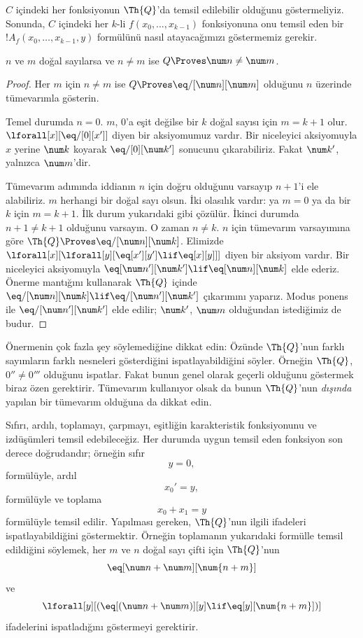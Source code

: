 \documentclass[../../../include/open-logic-section]{subfiles}
\begin{document}

$C$ içindeki her fonksiyonun $\Th{Q}$'da temsil edilebilir olduğunu
göstermeliyiz. Sonunda, $C$ içindeki her $k$-li
$f(x_0,\dots,x_{k-1})$ fonksiyonuna onu temsil eden bir
$!A_f(x_0,\dots,x_{k-1},y)$ formülünü nasıl atayacağımızı göstermemiz gerekir.

\begin{lem}
$n$ ve $m$ doğal sayılarsa ve $n \neq m$ ise
$Q \Proves \num n \neq \num m$.
\end{lem}

\begin{proof}
Her $m$ için $n \neq m$ ise $Q \Proves \eq/[\num n][\num m]$ olduğunu
$n$ üzerinde tümevarımla gösterin.

Temel durumda $n = 0$. $m$, $0$'a eşit değilse bir $k$ doğal sayısı için
$m = k + 1$ olur. $\lforall[x][\eq/[0][x']]$ diyen bir aksiyomumuz vardır.
Bir niceleyici aksiyomuyla $x$ yerine $\num k$ koyarak
$\eq/[0][\num k']$ sonucunu çıkarabiliriz. Fakat $\num k'$, yalnızca
$\num m$'dir.

Tümevarım adımında iddianın $n$ için doğru olduğunu varsayıp $n+1$'i ele
alabiliriz. $m$ herhangi bir doğal sayı olsun. İki olasılık vardır: ya $m=0$
ya da bir $k$ için $m=k+1$. İlk durum yukarıdaki gibi çözülür. İkinci durumda
$n+1 \neq k+1$ olduğunu varsayın. O zaman $n \neq k$. $n$ için tümevarım
varsayımına göre $\Th{Q} \Proves \eq/[\num n][\num k]$. Elimizde
$\lforall[x][\lforall[y][\eq[x'][y'] \lif \eq[x][y]]]$ diyen bir aksiyom
vardır. Bir niceleyici aksiyomuyla
$\eq[\num n'][\num k'] \lif \eq[\num n][\num k]$ elde ederiz. Önerme
mantığını kullanarak $\Th{Q}$ içinde
$\eq/[\num n][\num k] \lif \eq/[\num n'][\num k']$ çıkarımını yaparız.
Modus ponens ile $\eq/[\num n'][\num k']$ elde edilir; $\num k'$,
$\num m$ olduğundan istediğimiz de budur.
\end{proof}

Önermenin çok fazla şey söylemediğine dikkat edin: Özünde $\Th{Q}$'nun farklı
sayımların farklı nesneleri gösterdiğini ispatlayabildiğini söyler. Örneğin
$\Th{Q}$, $0'' \neq 0'''$ olduğunu ispatlar. Fakat bunun genel olarak
geçerli olduğunu göstermek biraz özen gerektirir. Tümevarım kullanıyor olsak
da bunun $\Th{Q}$'nun \emph{dışında} yapılan bir tümevarım olduğuna da dikkat
edin.

Sıfırı, ardılı, toplamayı, çarpmayı, eşitliğin karakteristik fonksiyonunu ve
izdüşümleri temsil edebileceğiz. Her durumda uygun temsil eden fonksiyon
son derece doğrudandır; örneğin sıfır
\[
y = 0,
\]
formülüyle, ardıl
\[
x_0' = y,
\]
formülüyle ve toplama
\[
x_0 + x_1 = y
\]
formülüyle temsil edilir. Yapılması gereken, $\Th{Q}$'nun ilgili ifadeleri
ispatlayabildiğini göstermektir. Örneğin toplamanın yukarıdaki formülle temsil
edildiğini söylemek, her $m$ ve $n$ doğal sayı çifti için $\Th{Q}$'nun
\[
\eq[\num n + \num m][\num {n+m}]
\]
ve
\[
\lforall[y][(\eq[(\num n + \num m)][y] \lif \eq[y][\num {n+m}])]
\]
ifadelerini ispatladığını göstermeyi gerektirir.
\end{document}
